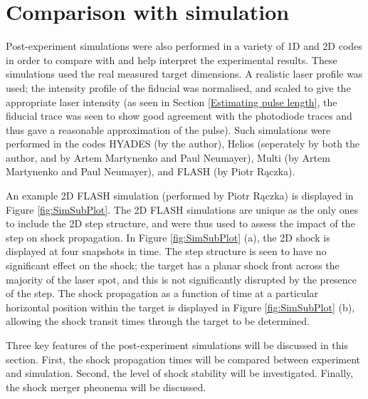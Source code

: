 \section{Comparison with simulation} \label{Post shock simulations}

Post-experiment simulations were also performed in a variety of 1D and 2D codes in order to compare with and help interpret the experimental results. These simulations used the real measured target dimensions. A realistic laser profile was used; the intensity profile of the fiducial was normalised, and scaled to give the appropriate laser intensity (as seen in Section \ref{Estimating pulse length}, the fiducial trace was seen to show good agreement with the photodiode traces and thus gave a reasonable approximation of the pulse). Such simulations were performed in the codes HYADES (by the author), Helios (seperately by both the author, and by Artem Martynenko and Paul Neumayer), Multi (by Artem Martynenko and Paul Neumayer), and FLASH (by Piotr R\k{a}czka).

An example 2D FLASH simulation (performed by Piotr R\k{a}czka) is displayed in Figure \ref{fig:SimSubPlot}. The 2D FLASH simulations are unique as the only ones to include the 2D step structure, and were thus used to assess the impact of the step on shock propagation. In Figure \ref{fig:SimSubPlot} (a), the 2D shock is displayed at four snapshots in time. The step structure is seen to have no significant effect on the shock; the target has a planar shock front across the majority of the laser spot, and this is not significantly disrupted by the presence of the step. The shock propagation as a function of time at a particular horizontal position within the target is displayed in Figure \ref{fig:SimSubPlot} (b), allowing the shock transit times through the target to be determined.

Three key features of the post-experiment simulations will be discussed in this section. First, the shock propagation times will be compared between experiment and simulation. Second, the level of shock stability will be investigated. Finally, the shock merger pheonema will be discussed.

